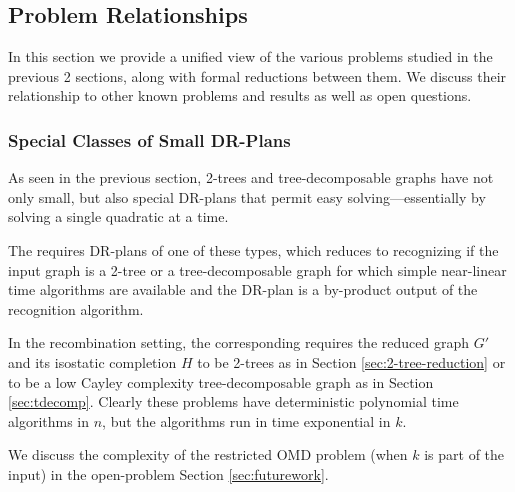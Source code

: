 \subsection{Problem Relationships}
\label{sec:table}

In this section we provide a unified view of the various problems studied in the previous 2 sections, along with formal reductions between them. We discuss their relationship to other known problems and results as well as open questions.





\subsubsection{Special Classes of Small DR-Plans}
As seen in the previous section, 2-trees and tree-decomposable graphs have not only small, but also special DR-plans that permit easy solving---essentially by solving a single quadratic at a time.

The  requires DR-plans of one of these types, which reduces to recognizing if the input graph is a 2-tree or a tree-decomposable graph for which simple near-linear time algorithms are available \cite{valdes1979recognition,fudos1997graph} and the DR-plan is a by-product output of the recognition algorithm.

In the recombination setting, the corresponding  requires the reduced graph $G'$ and its isostatic completion $H$ to be 2-trees as in Section \ref{sec:2-tree-reduction} or to be a low Cayley complexity tree-decomposable graph as in Section \ref{sec:tdecomp}. Clearly these problems have deterministic polynomial time algorithms in $n$, but the algorithms run in time exponential in $k$.

We discuss the complexity of the restricted OMD problem (when $k$ is part of the input) in the open-problem Section \ref{sec:futurework}.

